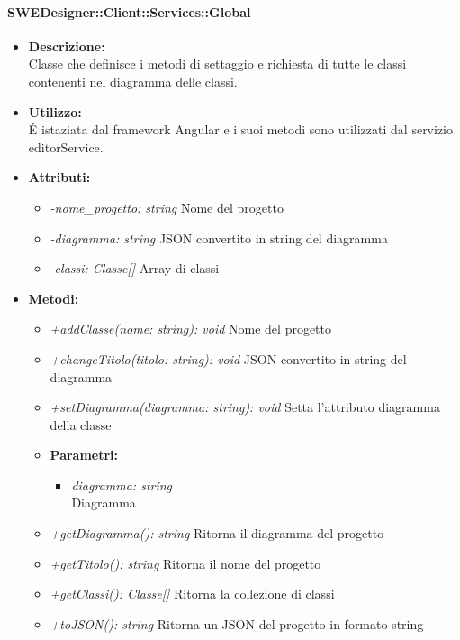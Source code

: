           	\paragraph{SWEDesigner::Client::Services::Global}
				\begin{itemize}
          			\item \textbf{Descrizione:}\\
          			Classe che definisce i metodi di settaggio e richiesta di tutte le classi contenenti nel diagramma delle classi.
          			\item \textbf{Utilizzo:}\\
          			É istaziata dal framework Angular e i suoi metodi sono utilizzati dal servizio editorService.
          			\item \textbf{Attributi:}\\
          			\begin{itemize}
          				\item \emph{-nome_progetto: string}
          				Nome del progetto
          				\item \emph{-diagramma: string}
          				JSON convertito in string del diagramma
          				\item \emph{-classi: Classe[]}
          				Array di classi
          			\end{itemize}
          			\item \textbf{Metodi:}\\
          			\begin{itemize}
          				\item \emph{+addClasse(nome: string): void}
          				Nome del progetto
          				\item \emph{+changeTitolo(titolo: string): void}
          				JSON convertito in string del diagramma
          				\item \emph{+setDiagramma(diagramma: string): void}
          				Setta l'attributo diagramma della classe
          				\item \textbf{Parametri:}\\
            				\begin{itemize}
            					\item \emph{diagramma: string}\\
            					Diagramma
            				\end{itemize}
          				\item \emph{+getDiagramma(): string}
          				Ritorna il diagramma del progetto
          				\item \emph{+getTitolo(): string}
          				Ritorna il nome del progetto
          				\item \emph{+getClassi(): Classe[]}
          				Ritorna la collezione di classi
          				\item \emph{+toJSON(): string}
          				Ritorna un JSON del progetto in formato string
          			\end{itemize}
          		\end{itemize}